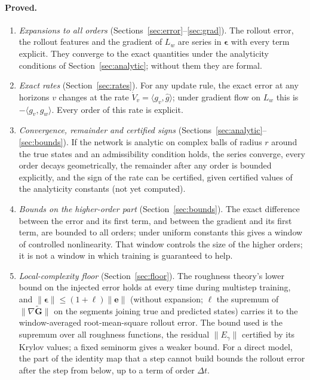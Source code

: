 \documentclass[11pt]{article}
\theoremstyle{definition}
\theoremstyle{remark}
\newcommand{\ee}{\mathbf{e}}
\newcommand{\Gt}{\tilde{\mathbf{G}}}
\newcommand{\eps}{\bm{\epsilon}}
\newcommand{\dt}{\Delta t}
\begin{document}
\paragraph{Proved.}
\begin{enumerate}
\item \emph{Expansions to all orders} (Sections~\ref{sec:error}--\ref{sec:grad}). The rollout error, the rollout features and the gradient of $L_w$ are series in $\eps$ with every term explicit. They converge to the exact quantities under the analyticity conditions of Section~\ref{sec:analytic}; without them they are formal.
\item \emph{Exact rates} (Section~\ref{sec:rates}). For any update rule, the exact error at any horizons $v$ changes at the rate $\dot V_v=\langle g_v,\hat g\rangle$; under gradient flow on $L_w$ this is $-\langle g_v,g_w\rangle$. Every order of this rate is explicit.
\item \emph{Convergence, remainder and certified signs} (Sections~\ref{sec:analytic}--\ref{sec:bounds}). If the network is analytic on complex balls of radius $r$ around the true states and an admissibility condition holds, the series converge, every order decays geometrically, the remainder after any order is bounded explicitly, and the sign of the rate can be certified, given certified values of the analyticity constants (not yet computed).
\item \emph{Bounds on the higher-order part} (Section~\ref{sec:bounds}). The exact difference between the error and its first term, and between the gradient and its first term, are bounded to all orders; under uniform constants this gives a window of controlled nonlinearity. That window controls the size of the higher orders; it is not a window in which training is guaranteed to help.
\item \emph{Local-complexity floor} (Section~\ref{sec:floor}). The roughness theory's lower bound on the injected error holds at every time during multistep training, and $\|\eps\|\le(1+\ell)\|\ee\|$ (without expansion; $\ell$ the supremum of $\|\nabla\Gt\|$ on the segments joining true and predicted states) carries it to the window-averaged root-mean-square rollout error. The bound used is the supremum over all roughness functions, the residual $\|E_\gamma\|$ certified by its Krylov values; a fixed seminorm gives a weaker bound. For a direct model, the part of the identity map that a step cannot build bounds the rollout error after the step from below, up to a term of order $\dt$.

\end{enumerate}
\end{document}
